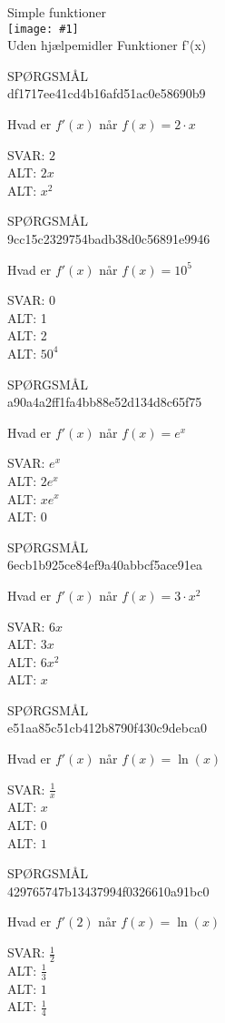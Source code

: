 \documentclass[]{article}
\newenvironment{question}[2]{SPØRGSMÅL\\}{\hspace{50px}}
\newcommand{\name}[1]{{\huge #1}\\}
\newcommand{\tag}[1]{#1}
\newcommand{\cover}[1]{\texttt{[image: \#1]}\\}
\newcommand{\answer}[1]{{\color{green} SVAR: #1}\\}
\newcommand{\alt}[1]{{\color{red} ALT: #1}\\}
\begin{document}
\name{Simple funktioner}
\cover{tangent.png}
\tag{Uden hjælpemidler}
\tag{Funktioner}
\tag{f'(x)}

\begin{question}{multi}\id{df1717ee41cd4b16afd51ac0e58690b9}
	
	Hvad er $f'(x)$ når $f(x)=2\cdot x$
	
	\answer{$2$}
	\alt{$2x$}
	\alt{$x^2$}
	
	\end{question}
	
	\begin{question}{multi}\id{9cc15c2329754badb38d0c56891e9946}
		
		Hvad er $f'(x)$ når $f(x)=10^5$
		
		\answer{$0$}
		\alt{1}
		\alt{2}
		\alt{$50^4$}
		
	\end{question}
	
	\begin{question}{multi}\id{a90a4a2ff1fa4bb88e52d134d8c65f75}
		
		Hvad er $f'(x)$ når $f(x)=e^x$
		
		\answer{$e^x$}
		\alt{$2e^x$}
		\alt{$xe^x$}
		\alt{$0$}
		
	\end{question}
	
	\begin{question}{multi}\id{6ecb1b925ce84ef9a40abbcf5ace91ea}
		
		Hvad er $f'(x)$ når $f(x)=3\cdot x^2$
		
		\answer{$6 x$}
		\alt{$3x$}
		\alt{$6x^2$}
		\alt{$x$}
		
	\end{question}
	
	\begin{question}{multi}\id{e51aa85c51cb412b8790f430c9debca0}
		
		Hvad er $f'(x)$ når $f(x)=\ln(x)$
		
		\answer{$\frac{1}{x}$}
		\alt{$x$}
		\alt{$0$}
		\alt{$1$}
		
	\end{question}
	
	\begin{question}{multi}\id{429765747b13437994f0326610a91bc0}
		
		Hvad er $f'(2)$ når $f(x)=\ln(x)$
		
		\answer{$\frac{1}{2}$}
		\alt{$\frac{1}{3}$}
		\alt{$1$}
		\alt{$\frac{1}{4}$}
		
	\end{question}
	
\end{document}
